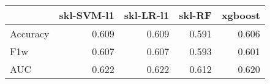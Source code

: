 \begin{tabular}{lrrrr}
\toprule
{} &  skl-SVM-l1 &  skl-LR-l1 &  skl-RF &  xgboost \\
\midrule
Accuracy &       0.609 &      0.609 &   0.591 &    0.606 \\
F1w      &       0.607 &      0.607 &   0.593 &    0.601 \\
AUC      &       0.622 &      0.622 &   0.612 &    0.620 \\
\bottomrule
\end{tabular}
